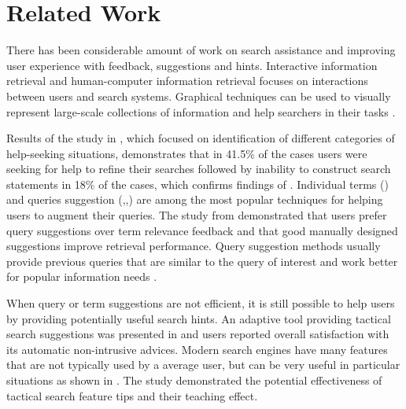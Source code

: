 \documentclass{sig-alternate}
\begin{document}
\section{Related Work}



There has been considerable amount of work on search assistance and improving user experience with feedback, suggestions and hints. Interactive information retrieval and human-computer information retrieval \cite{marchionini2006toward} focuses on interactions between users and search systems. Graphical techniques can be used to visually represent large-scale collections of information and help searchers in their tasks \cite{card1999readings}.

Results of the study in \cite{xie2009understanding}, which focused on identification of different categories of help-seeking situations, demonstrates that in 41.5\% of the cases users were seeking for help to refine their searches followed by inability to construct search statements in 18\% of the cases, which confirms findings of \cite{Holscher2000337}.
Individual terms (\cite{ruthven2003survey}) and queries suggestion (\cite{Jones:2006:GQS:1135777.1135835},\cite{Bhatia:2011:QSA:2009916.2010023},\cite{Cao:2008:CQS:1401890.1401995}) are among the most popular techniques for helping users to augment their queries.
The study from \cite{Kelly:2009:CQT:1571941.1572006} demonstrated that users prefer query suggestions over term relevance feedback and that good manually designed suggestions improve retrieval performance.
Query suggestion methods usually provide previous queries that are similar to the query of interest and work better for popular information needs \cite{Bhatia:2011:QSA:2009916.2010023}.

When query or term suggestions are not efficient, it is still possible to help users by providing potentially useful search hints. An adaptive tool providing tactical search suggestions was presented in \cite{Kriewel2007} and users reported overall satisfaction with its automatic non-intrusive advices. Modern search engines have many features that are not typically used by a average user, but can be very useful in particular situations as shown in \cite{Moraveji:2011:MIU:2009916.2009966}. The study demonstrated the potential effectiveness of tactical search feature tips and their teaching effect.
\end{document}
